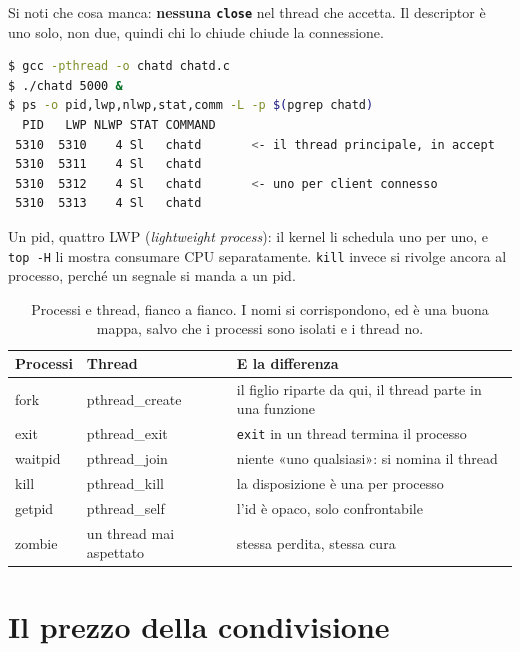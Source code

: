 Si noti che cosa manca: \textbf{nessuna \texttt{close}} nel thread che accetta. Il descriptor è uno solo, non due, quindi
chi lo chiude chiude la connessione.

\begin{lstlisting}[language=bash, title={I thread visti da fuori}]
$ gcc -pthread -o chatd chatd.c
$ ./chatd 5000 &
$ ps -o pid,lwp,nlwp,stat,comm -L -p $(pgrep chatd)
  PID   LWP NLWP STAT COMMAND
 5310  5310    4 Sl   chatd       <- il thread principale, in accept
 5310  5311    4 Sl   chatd
 5310  5312    4 Sl   chatd       <- uno per client connesso
 5310  5313    4 Sl   chatd
\end{lstlisting}

Un pid, quattro LWP (\emph{lightweight process}): il kernel li schedula uno per uno, e \texttt{top -H} li mostra consumare
CPU separatamente. \texttt{kill} invece si rivolge ancora al processo, perché un segnale si manda a un pid.

\begin{table}[H]
\centering
\begin{tabular}{>{\ttfamily}l >{\ttfamily}l l}
\toprule
\normalfont\textbf{Processi} & \normalfont\textbf{Thread} & \textbf{E la differenza} \\
\midrule
fork    & pthread\_create & il figlio riparte da qui, il thread parte in una funzione \\
exit    & pthread\_exit   & \texttt{exit} in un thread termina il processo \\
waitpid & pthread\_join   & niente «uno qualsiasi»: si nomina il thread \\
kill    & pthread\_kill   & la disposizione è una per processo \\
getpid  & pthread\_self   & l'id è opaco, solo confrontabile \\
\normalfont zombie & \normalfont un thread mai aspettato & stessa perdita, stessa cura \\
\bottomrule
\end{tabular}
\caption{Processi e thread, fianco a fianco. I nomi si corrispondono, ed è una buona mappa, salvo che i processi sono isolati
         e i thread no.}
\end{table}

\section{Il prezzo della condivisione}

